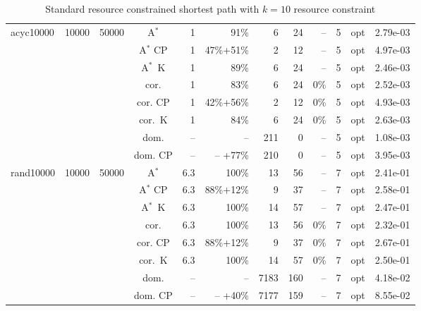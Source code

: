 \documentclass[11pt]{amsart}
\newenvironment{outdent}
{\begin{list}{}{\leftmargin-2cm\rightmargin\leftmargin}\centering\item\relax}
{\end{list}\ignorespacesafterend}
\theoremstyle{plain}
\theoremstyle{remark}
\begin{document}
\begin{table}
\begin{outdent}
\begin{footnotesize}
\begin{tabular}{|l|rrc|rr|rrr|rr|r|}
\hline
acyc10000 & 10000 & 50000 & A$^*$ & 1 & 91\% &6 & 24 & -- &5 & opt & 2.79e-03 \\
&&&A$^*$ CP & 1 & 47\%+51\% &2 & 12 & -- &5 & opt & 4.97e-03 \\
&&&A$^*$~K & 1 & 89\% &6 & 24 & -- &5 & opt & 2.46e-03 \\
&&&cor. & 1 & 83\% &6 & 24 & 0\% &5 & opt & 2.52e-03 \\
&&&cor. CP & 1 & 42\%+56\% &2 & 12 & 0\% &5 & opt & 4.93e-03 \\
&&&cor.~K & 1 & 84\% &6 & 24 & 0\% &5 & opt & 2.63e-03 \\
&&&dom. & -- & --  &211 & 0 & -- &5 & opt & 1.08e-03 \\
&&&dom. CP & -- & -- +77\% &210 & 0 & -- &5 & opt & 3.95e-03 \\
\hline
rand10000 & 10000 & 50000 & A$^*$ & 6.3 & 100\% &13 & 56 & -- &7 & opt & 2.41e-01 \\
&&&A$^*$ CP & 6.3 & 88\%+12\% &9 & 37 & -- &7 & opt & 2.58e-01 \\
&&&A$^*$~K & 6.3 & 100\% &14 & 57 & -- &7 & opt & 2.47e-01 \\
&&&cor. & 6.3 & 100\% &13 & 56 & 0\% &7 & opt & 2.32e-01 \\
&&&cor. CP & 6.3 & 88\%+12\% &9 & 37 & 0\% &7 & opt & 2.67e-01 \\
&&&cor.~K & 6.3 & 100\% &14 & 57 & 0\% &7 & opt & 2.50e-01 \\
&&&dom. & -- & --  &7183 & 160 & -- &7 & opt & 4.18e-02 \\
&&&dom. CP & -- & -- +40\% &7177 & 159 & -- &7 & opt & 8.55e-02 \\
\hline
\end{tabular}
\end{footnotesize}
\end{outdent}
\caption{Standard resource constrained shortest path with $k=10$ resource constraint}
\label{tab:RCSP10constraints}
\end{table}
\end{document}
